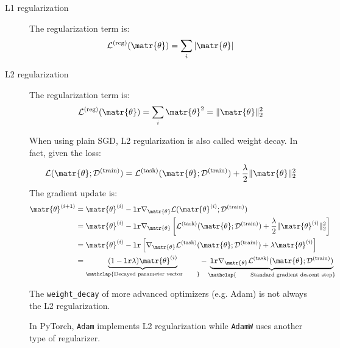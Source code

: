 \begin{description}
    \item[L1 regularization] 
        The regularization term is:
        \[ \mathcal{L}^\text{(reg)}(\matr{\theta}) = \sum_{i} \vert \matr{\theta} \vert \]

    \item[L2 regularization] 
        The regularization term is:
        \[ \mathcal{L}^\text{(reg)}(\matr{\theta}) = \sum_{i} \matr{\theta}^2 = \Vert \matr{\theta} \Vert_2^2 \]

        \begin{remark}
            When using plain SGD, L2 regularization is also called weight decay.
            In fact, given the loss:
            \[ 
                \mathcal{L}(\matr{\theta}; \mathcal{D}^\text{(train)}) = 
                \mathcal{L}^\text{(task)}(\matr{\theta}; \mathcal{D}^\text{(train)}) + 
                \frac{\lambda}{2} \Vert \matr{\theta} \Vert_2^2
            \]
            The gradient update is:
            \[
                \begin{split}
                    \matr{\theta}^{(i+1)} &= \matr{\theta}^{(i)} - \texttt{lr} \nabla_\matr{\theta} \mathcal{L}(\matr{\theta}^{(i)}; \mathcal{D}^\text{(train)}) \\
                        &= \matr{\theta}^{(i)} - \texttt{lr} \nabla_\matr{\theta}\left[ 
                                \mathcal{L}^\text{(task)}(\matr{\theta}; \mathcal{D}^\text{(train)}) + 
                                \frac{\lambda}{2} \Vert \matr{\theta}^{(i)} \Vert_2^2
                            \right] \\
                        &= \matr{\theta}^{(i)} - \texttt{lr} \left[ 
                                \nabla_\matr{\theta} \mathcal{L}^\text{(task)}(\matr{\theta}; \mathcal{D}^\text{(train)}) + 
                                \lambda \matr{\theta}^{(i)}
                            \right] \\
                        &= 
                            \underbrace{(1 - \texttt{lr} \lambda) \matr{\theta}^{(i)}}_{\mathclap{\text{Decayed parameter vector \phantom{aaaa}}}} - 
                            \underbrace{\texttt{lr} \nabla_\matr{\theta} \mathcal{L}^\text{(task)}(\matr{\theta}; \mathcal{D}^\text{(train)})}_{\mathclap{\text{\phantom{aaaa} Standard gradient descent step}}}
                \end{split}  
            \]
        \end{remark}

        \begin{remark}
            The \texttt{weight\_decay} of more advanced optimizers (e.g. Adam) is not always the L2 regularization.
            
            In PyTorch, \texttt{Adam} implements L2 regularization while \texttt{AdamW} uses another type of regularizer.
        \end{remark}
\end{description}



